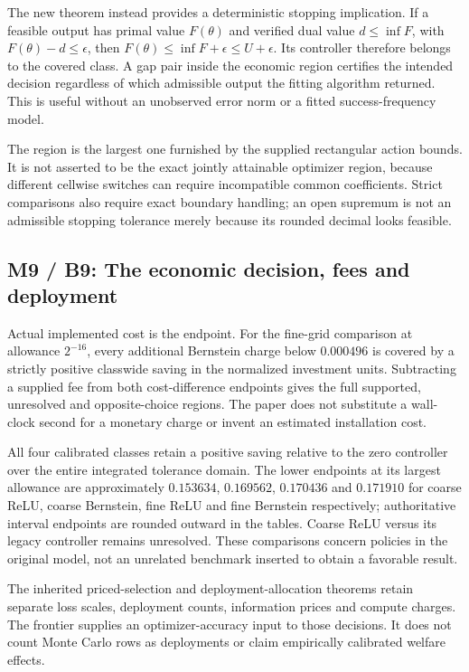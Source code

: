 \documentclass[ecta,nameyear,draft]{econsocart}
\begin{document}
The new theorem instead provides a deterministic stopping implication.
If a feasible output has primal value \(F(\theta)\) and verified dual
value \(d\le\inf F\), with \(F(\theta)-d\le\epsilon\), then
\(F(\theta)\le\inf F+\epsilon\le U+\epsilon\). Its controller therefore
belongs to the covered class. A gap pair inside the economic region
certifies the intended decision regardless of which admissible output
the fitting algorithm returned. This is useful without an unobserved
error norm or a fitted success-frequency model.

The region is the largest one furnished by the supplied rectangular
action bounds. It is not asserted to be the exact jointly attainable
optimizer region, because different cellwise switches can require
incompatible common coefficients. Strict comparisons also require exact
boundary handling; an open supremum is not an admissible stopping
tolerance merely because its rounded decimal looks feasible.

\hypertarget{m9-b9-the-economic-decision-fees-and-deployment}{%
\subsection{M9 / B9: The economic decision, fees and
deployment}\label{m9-b9-the-economic-decision-fees-and-deployment}}

Actual implemented cost is the endpoint. For the fine-grid comparison at
allowance \(2^{-16}\), every additional Bernstein charge below
\(0.000496\) is covered by a strictly positive classwide saving in the
normalized investment units. Subtracting a supplied fee from both
cost-difference endpoints gives the full supported, unresolved and
opposite-choice regions. The paper does not substitute a wall-clock
second for a monetary charge or invent an estimated installation cost.

All four calibrated classes retain a positive saving relative to the
zero controller over the entire integrated tolerance domain. The lower
endpoints at its largest allowance are approximately \(0.153634\),
\(0.169562\), \(0.170436\) and \(0.171910\) for coarse ReLU, coarse
Bernstein, fine ReLU and fine Bernstein respectively; authoritative
interval endpoints are rounded outward in the tables. Coarse ReLU versus
its legacy controller remains unresolved. These comparisons concern
policies in the original model, not an unrelated benchmark inserted to
obtain a favorable result.

The inherited priced-selection and deployment-allocation theorems retain
separate loss scales, deployment counts, information prices and compute
charges. The frontier supplies an optimizer-accuracy input to those
decisions. It does not count Monte Carlo rows as deployments or claim
empirically calibrated welfare effects.
\end{document}
